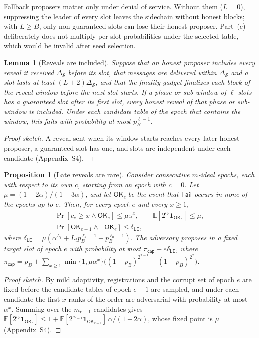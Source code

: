 \documentclass[10pt,journal,compsoc]{IEEEtran}
\theoremstyle{tplain}
\newtheorem{lemma}[theorem]{Lemma}
\newtheorem{proposition}[theorem]{Proposition}
\theoremstyle{tdef}
\theoremstyle{remark}
\newcommand{\supp}[1]{Appendix~#1}
\begin{document}
\noindent Fallback proposers matter only under denial of service. Without them ($L=0$), suppressing the leader of every slot leaves the sidechain without honest blocks; with $L\ge B$, only non-guaranteed slots can lose their honest proposer. Part~(c) deliberately does not multiply per-slot probabilities under the selected table, which would be invalid after seed selection.

\begin{lemma}[Reveals are included]\label{lem:incl}
Suppose that an honest proposer includes every reveal it received $\Delta_{\mathcal S}$ before its slot, that messages are delivered within $\Delta_{\mathcal S}$ and a slot lasts at least $(L+2)\Delta_{\mathcal S}$, and that the finality gadget finalizes each block of the reveal window before the next slot starts. If a phase or sub-window of $\ell$ slots has a guaranteed slot after its first slot, every honest reveal of that phase or sub-window is included. Under each candidate table of the epoch that contains the window, this fails with probability at most $p_B^{\ell-1}$.
\end{lemma}
\begin{proof}[Proof sketch]
A reveal sent when its window starts reaches every later honest proposer, a guaranteed slot has one, and slots are independent under each candidate (\supp{S4}).
\end{proof}

\begin{proposition}[Late reveals are rare]\label{prop:late}
Consider consecutive $m$-ideal epochs, each with respect to its own $c$, starting from an epoch with $c=0$. Let $\mu=(1-2\alpha)/(1-3\alpha)$, and let $\mathsf{OK}_e$ be the event that $\mathsf{Fail}$ occurs in none of the epochs up to $e$. Then, for every epoch $e$ and every $x\ge1$,
\begin{gather*}
\Pr[c_e\ge x\wedge\mathsf{OK}_e]\le\mu\alpha^x,\qquad\mathbb E[2^{c_e}\mathbf 1_{\mathsf{OK}_e}]\le\mu,\\
\Pr[\mathsf{OK}_{e-1}\wedge\neg\mathsf{OK}_e]\le\delta_{\mathsf{LE}},
\end{gather*}
where $\delta_{\mathsf{LE}}=\mu(\alpha^{L_t}+L_tp_B^{\ell_s-1}+p_B^{\ell_0-1})$. The adversary proposes in a fixed target slot of epoch $e$ with probability at most $\pi_{\mathsf{cap}}+e\delta_{\mathsf{LE}}$, where $\pi_{\mathsf{cap}}=p_B+\sum_{x\ge1}\min\{1,\mu\alpha^x\}\big((1-p_B)^{2^{x-1}}-(1-p_B)^{2^x}\big)$.
\end{proposition}
\begin{proof}[Proof sketch]
By mild adaptivity, registrations and the corrupt set of epoch $e$ are fixed before the candidate tables of epoch $e-1$ are sampled, and under each candidate the first $x$ ranks of the order are adversarial with probability at most $\alpha^x$. Summing over the $m_{e-1}$ candidates gives $\mathbb E[2^{c_e}\mathbf 1_{\mathsf{OK}_e}]\le1+\mathbb E[2^{c_{e-1}}\mathbf 1_{\mathsf{OK}_{e-1}}]\,\alpha/(1-2\alpha)$, whose fixed point is $\mu$ (\supp{S4}).
\end{proof}
\end{document}
